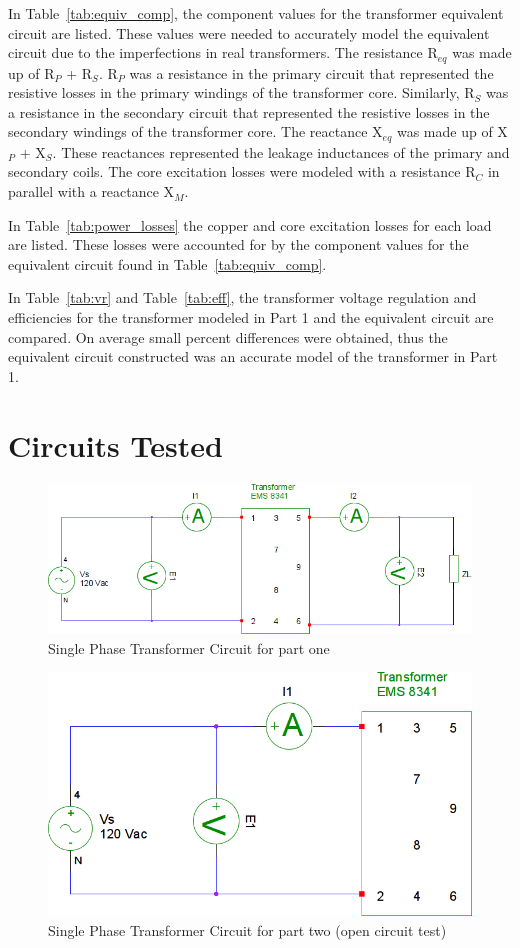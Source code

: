 \documentclass{article}
\begin{document}
In Table~\ref{tab:equiv_comp}, the component values for the transformer
equivalent circuit are listed. These values were needed to accurately model the
equivalent circuit due to the imperfections in real transformers. The
resistance R$_{eq}$ was made up of R$_P$ + R$_S$. R$_P$ was a resistance in the
primary circuit that represented the resistive losses in the primary windings
of the transformer core. Similarly, R$_S$ was a resistance in the secondary
circuit that represented the resistive losses in the secondary windings of the
transformer core. The reactance X$_{eq}$ was made up of X$_P$ + X$_S$. These
reactances represented the leakage inductances of the primary and secondary
coils.  The core excitation losses were modeled with a resistance R$_C$ in
parallel with a reactance X$_M$.

In Table~\ref{tab:power_losses} the copper and core excitation losses for each
load are listed. These losses were accounted for by the component values for
the equivalent circuit found in Table~\ref{tab:equiv_comp}.

In Table~\ref{tab:vr} and Table~\ref{tab:eff}, the transformer voltage
regulation and efficiencies for the transformer modeled in Part 1 and the
equivalent circuit are compared.  On average small percent differences were
obtained, thus the equivalent circuit constructed was an accurate model of the
transformer in Part 1.

\section*{Circuits Tested}
\begin{figure}[H]
  \centering
  \includegraphics[width=.8\textwidth]{img/circuit_01}
  \caption{Single Phase Transformer Circuit for part one}
  \label{fig:circuit_01}
\end{figure}

\begin{figure}[H]
  \centering
  \includegraphics[width=.8\textwidth]{img/circuit_02}
  \caption{Single Phase Transformer Circuit for part two (open circuit test)}
  \label{fig:circuit_02}
\end{figure}
\end{document}
